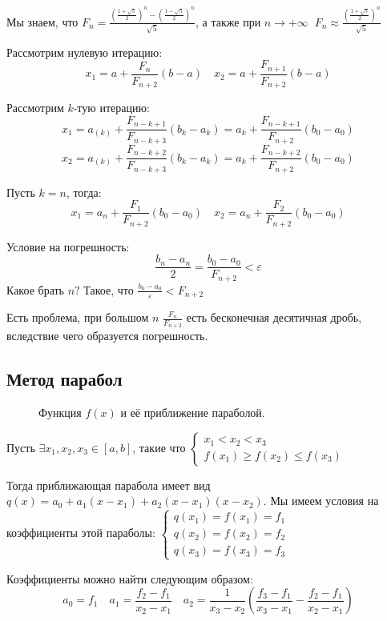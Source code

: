 \documentclass[12pt, a4paper, oneside]{book}
\begin{document}
Мы знаем, что \(F_n = \frac{\left( \frac{1 + \sqrt{5}}{2} \right)^n - \left( \frac{1 - \sqrt{5}}{2} \right)^n}{\sqrt{5}} \), а также при \(n \to +\infty\ \) \(F_n \approx \frac{\left( \frac{1 + \sqrt{5}}{2} \right)^n}{\sqrt{5}}\)

Рассмотрим нулевую итерацию:
\[x_1 = a + \frac{F_n}{F_{n + 2}} (b - a) \quad x_2 = a + \frac{F_{n+1}}{F_{n + 2}} (b - a)\]

Рассмотрим \(k\)-тую итерацию:
\[x_1 = a_{(k)} + \frac{F_{n - k + 1}}{F_{n - k + 3}} (b_k - a_k) = a_k + \frac{F_{n - k + 1}}{F_{n + 2}} (b_0 - a_0)\]
\[x_2 = a_{(k)} + \frac{F_{n - k + 2}}{F_{n - k + 3}} (b_k - a_k) = a_k + \frac{F_{n - k + 2}}{F_{n + 2}} (b_0 - a_0)\]

Пусть \(k = n\), тогда:
\[x_1 = a_n + \frac{F_1}{F_{n + 2}} (b_0 - a_0) \quad x_2 = a_n + \frac{F_2}{F_{n + 2}} (b_0 - a_0)\]

Условие на погрешность:
\[\frac{b_n - a_n}{2} = \frac{b_0 - a_0}{F_{n + 2}} < \varepsilon\]
Какое брать \(n?\) Такое, что \(\frac{b_0 - a_0}{\varepsilon} < F_{n + 2}\)

Есть проблема, при большом \(n\) \(\frac{F_n}{F_{n + 2}}\) есть бесконечная десятичная дробь, вследствие чего образуется погрешность.

\subsection{Метод парабол}

\begin{figure}[h]
    \centering
    
    \caption{Функция \(f(x)\) и её приближение параболой.}
\end{figure}

Пусть \(\exists x_1, x_2, x_3\in[a, b]\), такие что \(\begin{cases}
    x_1 < x_2 < x_3 \\
    f(x_1) \geq f(x_2) \leq f(x_3)
\end{cases}\)

Тогда приближающая парабола имеет вид \(q(x) = a_0 + a_1(x - x_1) + a_2(x - x_1)(x - x_2)\). Мы имеем условия на коэффициенты этой параболы: \(\begin{cases}
    q(x_1) = f(x_1) = f_1 \\
    q(x_2) = f(x_2) = f_2 \\
    q(x_3) = f(x_3) = f_3
\end{cases}\)

Коэффициенты можно найти следующим образом:
\[a_0 = f_1 \quad a_1 = \frac{f_2 - f_1}{x_2 - x_1} \quad a_2 = \frac{1}{x_3 - x_2} \left( \frac{f_3 - f_1}{x_3 - x_1} - \frac{f_2 - f_1}{x_2 - x_1} \right) \]
\end{document}
